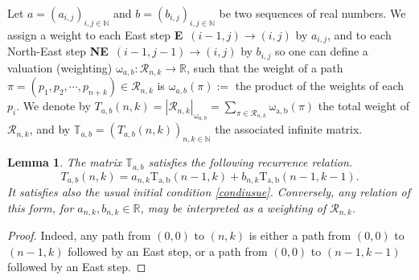 \documentclass[12pt,a4paper]{article}
\newtheorem{lemma}[theorem]{Lemma}%
\theoremstyle{definition} %
\theoremstyle{remark}
\theoremstyle{examples}
\newenvironment{porofo}[1][Proof]{%
	\begin{proof}[#1]%
	}{%
	\end{proof}%
}
\newcommand{\cheg}{\mathcal{R}_{n,k}}
\newcommand{\chegg}{\mathcal{R}_{n,k}}
\newcommand{\sui}[3]{\mathrm{#1}(#2,#3)}
\newcommand{\suit}[1]{{#1}(n,k)}
\newcommand{\coul}[1]{#1_{n,k}}
\newcommand{\cou}[3]{#1_{#2,#3}}
\newcommand{\es}{\textbf{E}}
\newcommand{\nes}{\textbf{NE}}
\newcommand{\ma}[1]{\mathbb{#1}}
\newcommand{\real}{\mathbb{R}}
\newcommand{\natu}{\mathbb{N}}
\newcommand{\reel}{\mathbb{R}}
\newcommand{\poiw}[1]{\mathrm{#1}}
\begin{document}
			Let $a=(\cou{a}{i}{j})_{i,j\in \natu}$ and $b=(\cou{b}{i}{j})_{i,j\in \natu}$ be two sequences of real numbers.  We assign a weight to each East step 
		\es\ $(i-1,j)\to (i,j)$ by $\cou{a}{i}{j}$, and to each North-East step  
		\nes\ $(i-1,j-1)\to (i,j)$ by $\cou{b}{i}{j}$ so one can define  a valuation (weighting)  
		$\poiw{\omega}_{a,b}:{\chegg}\to{\reel}$, such that the weight of a path $\pi=(p_1,p_2,\cdots,p_{n+k})\in \chegg$ is
		\(\poiw{\omega}_{a,b}(\pi):=\) the product of the weights of each $p_i$.
			We denote by $\suit{T_{a,b}} = |\chegg|_{\poiw{\omega}_{a,b}}= \sum_{\pi \in \cheg} \poiw{\omega_{a,b}}(\pi)$ the total weight of $\chegg$, and by  
		$\ma{T}_{a,b} = (\suit{T_{a,b}})_{n,k\in \natu}$ the associated infinite matrix.
	\begin{lemma}\label{rem2}
		The matrix 	$\ma{T}_{a,b}$ satisfies the following recurrence relation.
		\begin{equation}\label{relprinc} 
		\suit{T_{a,b}}=\coul{a}\sui{T_{a,b}}{n-1}{k}
		+\coul{b}\sui{T_{a,b}}{n-1}{k-1}.
		\end{equation}
		It satisfies also the usual initial condition \eqref{condiusue}. 
		Conversely, any relation of this form, for $\coul{a},\coul{b}\in \real$, may be interpreted as a weighting of $\chegg$.
	\end{lemma}
	\begin{porofo} Indeed, any path from $(0,0)$ to $(n,k)$ is either a path from $(0,0)$ to $(n-1,k)$ followed by an East step, or a path from $(0,0)$ to $(n-1,k-1)$ followed by an East step.
		\end{porofo}
\end{document}
